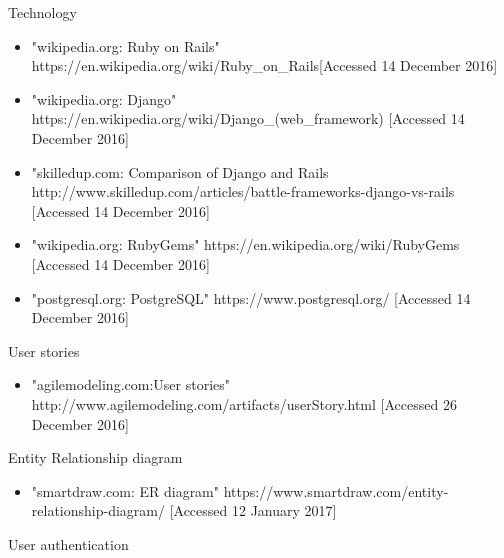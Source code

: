 \documentclass{l3proj}
\begin{document}
\label{tech}
Technology
\begin{itemize}

\item "wikipedia.org: Ruby on Rails"
\newline https://en.wikipedia.org/wiki/Ruby\_on\_Rails[Accessed 14 December 2016]

\item "wikipedia.org: Django"
\newline https://en.wikipedia.org/wiki/Django\_(web\_framework) [Accessed 14 December 2016]

\item "skilledup.com: Comparison of Django and Rails
\newline http://www.skilledup.com/articles/battle-frameworks-django-vs-rails [Accessed 14 December 2016]

\item "wikipedia.org: RubyGems"
\newline https://en.wikipedia.org/wiki/RubyGems [Accessed 14 December 2016]

\item "postgresql.org: PostgreSQL"
\newline https://www.postgresql.org/ [Accessed 14 December 2016]


\end{itemize}




\label{user_stories}

User stories

\begin{itemize}

\item "agilemodeling.com:User stories"
\newline http://www.agilemodeling.com/artifacts/userStory.html [Accessed 26 December 2016]

\end{itemize}


\label{er}
Entity Relationship diagram

\begin{itemize}

\item "smartdraw.com: ER diagram"
\newline https://www.smartdraw.com/entity-relationship-diagram/ [Accessed 12 January 2017]

\end{itemize}

\label{authentication}
User authentication
\end{document}
